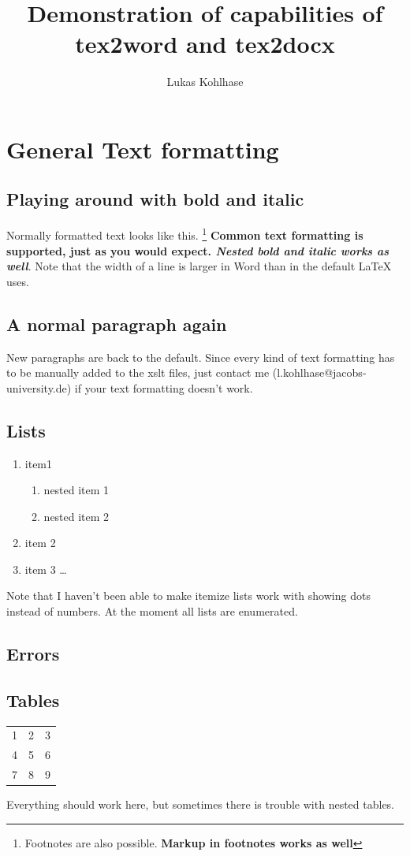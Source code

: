 \documentclass{article}
\author{Lukas Kohlhase}
\title{Demonstration of capabilities of tex2word and tex2docx}
\begin{document}
\maketitle
\tableofcontents
\section{General Text formatting}
\subsection{Playing around with bold and italic}
Normally formatted text looks like this. \footnote{Footnotes are also possible. \textbf{Markup in footnotes works as well}} \textbf{Common text formatting is supported, just as you would expect. \textit {Nested bold and italic works as well}}. Note that the width of a line is larger in Word than in the default LaTeX uses.  \\ 
\subsection{A normal paragraph again}
New paragraphs are back to the default. Since every kind of text formatting has to be manually added to the xslt files, just contact me (l.kohlhase@jacobs-university.de) if your text formatting doesn't work. 
\subsection{Lists}
\begin{enumerate}
\item item1
\begin{enumerate}
\item nested item 1
\item nested item 2
\end{enumerate}
\item item 2 
\item item 3 \ldots 
\end{enumerate}
Note that I haven't been able to make itemize lists work with showing dots instead of numbers. At the moment all lists are enumerated.
\subsection{Errors}
\subsection {Tables}
\begin{tabular}{ c c c }
  1 & 2 & 3 \\
  4 & 5 & 6 \\
  7 & 8 & 9 \\
\end{tabular}
Everything should work here, but sometimes there is trouble with nested tables. 
\end{document}
